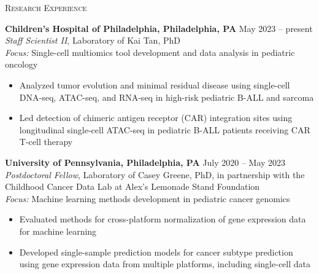 \documentclass[11pt]{article}
\begin{document}
\hrulefill

\bigskip

\textsc{{\Large Research Experience}}

\bigskip
\textbf{Children's Hospital of Philadelphia, Philadelphia, PA} \hfill May 2023 -- present \\
\emph{Staff Scientist II}, Laboratory of Kai Tan, PhD \\
\emph{Focus:} Single-cell multiomics tool development and data analysis in pediatric oncology
\begin{itemize}
  \item Analyzed tumor evolution and minimal residual disease using single-cell DNA-seq, ATAC-seq, and RNA-seq in high-risk pediatric B-ALL and sarcoma
  \item Led detection of chimeric antigen receptor (CAR) integration sites using longitudinal single-cell ATAC-seq in pediatric B-ALL patients receiving CAR T-cell therapy
\end{itemize}

\bigskip

\textbf{University of Pennsylvania, Philadelphia, PA} \hfill July 2020 -- May 2023 \\
\emph{Postdoctoral Fellow}, Laboratory of Casey Greene, PhD, in partnership with the Childhood Cancer Data Lab at Alex's Lemonade Stand Foundation \\
\emph{Focus:} Machine learning methods development in pediatric cancer genomics
\begin{itemize}
  \item Evaluated methods for cross-platform normalization of gene expression data for machine learning
  \item Developed single-sample prediction models for cancer subtype prediction using gene expression data from multiple platforms, including single-cell data
\end{itemize}

\bigskip
\end{document}

